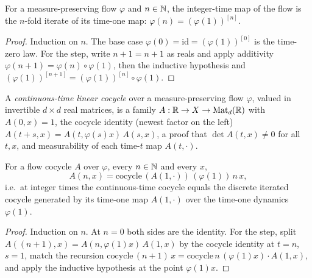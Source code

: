\begin{lemma}\label{natCast_eq_iterate}
  \leanok
  For a measure-preserving flow \( \varphi \) and \( n \in \mathbb{N} \), the integer-time map of the
  flow is the \( n \)-fold iterate of its time-one map: \( \varphi(n) = (\varphi(1))^{[n]} \).
\end{lemma}
\begin{proof}\leanok
  Induction on \( n \). The base case \( \varphi(0) = \mathrm{id} = (\varphi(1))^{[0]} \) is the
  time-zero law. For the step, write \( n+1 = n + 1 \) as reals and apply additivity
  \( \varphi(n+1) = \varphi(n) \circ \varphi(1) \), then the inductive hypothesis and
  \( (\varphi(1))^{[n+1]} = (\varphi(1))^{[n]} \circ \varphi(1) \).
\end{proof}

\begin{definition}\label{FlowCocycle}
  \leanok
  A \emph{continuous-time linear cocycle} over a measure-preserving flow \( \varphi \), valued in
  invertible \( d \times d \) real matrices, is a family
  \( A : \mathbb{R} \to X \to \mathrm{Mat}_d(\mathbb{R}) \) with \( A(0,x) = 1 \), the cocycle identity (newest
  factor on the left) \( A(t+s,x) = A(t, \varphi(s)x)\, A(s,x) \), a proof that
  \( \det A(t,x) \ne 0 \) for all \( t, x \), and measurability of each time-\( t \) map
  \( A(t,\cdot) \).
\end{definition}

\begin{proposition}\label{toCocycle_eq}
  \leanok
  For a flow cocycle \( A \) over \( \varphi \), every \( n \in \mathbb{N} \) and every \( x \),
  \[ A(n, x) = \mathrm{cocycle}\,(A(1,\cdot))\,(\varphi(1))\, n\, x, \]
  i.e.\ at integer times the continuous-time cocycle equals the discrete iterated cocycle
  generated by its time-one map \( A(1,\cdot) \) over the time-one dynamics \( \varphi(1) \).
\end{proposition}
\begin{proof}\leanok
  Induction on \( n \). At \( n = 0 \) both sides are the identity. For the step, split
  \( A((n+1),x) = A(n, \varphi(1)x)\, A(1,x) \) by the cocycle identity at \( t = n \), \( s = 1 \),
  match the recursion \( \mathrm{cocycle}\,(n+1)\,x = \mathrm{cocycle}\, n\, (\varphi(1)x) \cdot A(1,x) \),
  and apply the inductive hypothesis at the point \( \varphi(1)x \).
\end{proof}


